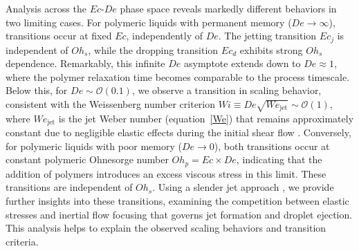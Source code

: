 \documentclass{jfm}
\newcommand{\oo}{\color{magenta} \normalfont}
\newcommand{\bb}{\color{black} \normalfont}
\begin{document}
Analysis across the $Ec$-$De$ phase space reveals markedly different behaviors in two limiting cases.
For polymeric liquids with permanent memory ($De \to \infty$), transitions occur at fixed $Ec$, independently of $De$. The jetting transition $Ec_j$ is independent of $Oh_s$, while the dropping transition $Ec_d$ exhibits strong $Oh_s$ dependence.
Remarkably, this infinite $De$ asymptote extends down to $De \approx 1$, where the polymer relaxation time becomes comparable to the process timescale.
\oo
Below this, for $De \sim \mathcal{O}(0.1)$, we observe a transition in scaling behavior, consistent with the Weissenberg number criterion $Wi \equiv De\sqrt{We_{\text{jet}}} \sim \mathcal{O}(1)$, where $We_{\text{jet}}$ is the jet Weber number (equation~\eqref{We}) that remains approximately constant due to negligible elastic effects during the initial shear flow \citep{blanco2021jets}.
\bb
Conversely, for polymeric liquids with poor memory ($De \to 0$), both transitions occur at constant polymeric Ohnesorge number $Oh_p = Ec \times De$, indicating that the addition of polymers introduces an excess viscous stress in this limit.
These transitions are independent of $Oh_s$.
Using a slender jet approach \citep{driessen2013stability,gordillo2020impulsive,eggers2015singularities}, we provide further insights into these transitions, examining the competition between elastic stresses and inertial flow focusing that governs jet formation and droplet ejection. This analysis helps to explain the observed scaling behaviors and transition criteria.
\end{document}
